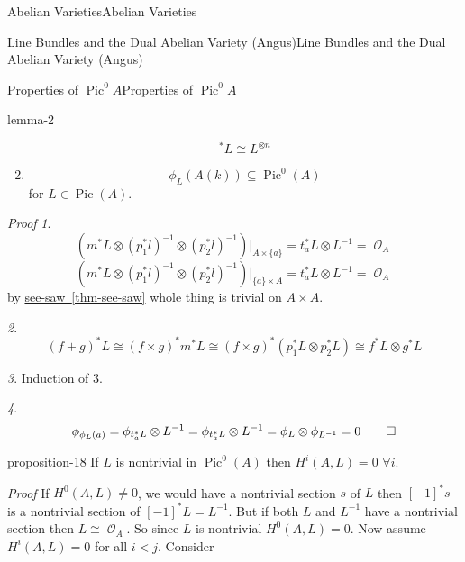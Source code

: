 \documentclass[10pt,]{book}
\makeatletter
\renewcommand*{\proofname}{Proof}
\renewenvironment{proof}[1][\proofname]{\par
  \pushQED{\qed}%
  \normalfont \topsep6\p@\@plus6\p@\relax
  \trivlist
  \item\relax
    {\itshape
    #1\@addpunct{.}}\hspace\labelsep\ignorespaces
}{%
  \popQED\endtrivlist\@endpefalse
}
\numberwithin{equation}{section}
\newcommand{\sheaf}[1]{\operatorname{\mathcal{#1}}}
\newcommand{\lb}{[}
\newcommand{\rb}{]}
\DeclareMathOperator{\Pic}{Pic}
\newcommand{\lt}{<}
\makeatother
\begin{document}
\begin{chapterptx}{Abelian Varieties}{}{Abelian Varieties}{}{}
\begin{sectionptx}{Line Bundles and the Dual Abelian Variety (Angus)}{}{Line Bundles and the Dual Abelian Variety (Angus)}{}{}
\begin{subsectionptx}{Properties of \(\Pic^0 A\)}{}{Properties of \(\Pic^0 A\)}{}{}
\begin{lemma}{}{}{lemma-2}
\begin{enumerate}
\begin{equation*}
[n]^* L \cong L^{\otimes n}
\end{equation*}
%
\item\hypertarget{li-32}{}%
\begin{equation*}
\phi_L(A(k)) \subseteq \Pic^0(A)
\end{equation*}
for \(L \in \Pic (A)\).%
\end{enumerate}
%
\end{lemma}
\begin{proof}\hypertarget{proof-34}{}
\hypertarget{case-7}{}\textit{1}. \hypertarget{p-180}{}%
%
\begin{equation*}
(m^*L\otimes (p_1^*l)^{-1} \otimes (p_2^*l)^{-1})|_{A\times\{a\}} = t_a^*L \otimes L^{-1} = \sheaf O_A
\end{equation*}
%
\begin{equation*}
(m^*L\otimes (p_1^*l)^{-1} \otimes (p_2^*l)^{-1})|_{\{a\}\times A} = t_a^*L \otimes L^{-1} = \sheaf O_A
\end{equation*}
by \hyperref[thm-see-saw]{see-saw~\ref{thm-see-saw}} whole thing is trivial on \(A\times A\).%
\par\medskip\noindent
\hypertarget{case-8}{}\textit{2}. \hypertarget{p-181}{}%
%
\begin{equation*}
(f+g)^*L\cong (f\times g)^* m^*L \cong (f\times g)^*(p_1^*L \otimes p_2^*L) \cong f^*L \otimes g^*L
\end{equation*}
%
\par\medskip\noindent
\hypertarget{case-9}{}\textit{3}. \hypertarget{p-182}{}%
Induction of 3.%
\par\medskip\noindent
\hypertarget{case-10}{}\textit{4}. \hypertarget{p-183}{}%
%
\begin{equation*}
\phi_{\phi_L(a)} = \phi_{t^*_a L}\otimes L^{-1} = \phi _{t_a^*L}\otimes L^{-1} = \phi_L \otimes \phi_{L^{-1}} = 0\qedhere
\end{equation*}
%
\end{proof}
\begin{proposition}{}{}{proposition-18}%
\hypertarget{p-184}{}%
If \(L\) is nontrivial in \(\Pic^0(A)\) then \(H^i(A,L) = 0\) \(\forall i\).%
\end{proposition}
\begin{proof}\hypertarget{proof-35}{}
\hypertarget{p-185}{}%
If \(H^0(A,L) \ne 0\), we would have  a nontrivial section \(s\) of \(L\) then \(\lb -1\rb ^* s\) is   a nontrivial section of \(\lb-1\rb^* L = L^{-1}\). But if both \(L\) and \(L^{-1}\) have  a nontrivial section then \(L \cong \sheaf O_A\). So since \(L\) is nontrivial \(H^0(A,L) = 0\). Now assume \(H^i(A,L) = 0\) for all \(i\lt j\). Consider%

\end{proof}
\end{subsectionptx}
\end{sectionptx}
\end{chapterptx}
\end{document}
